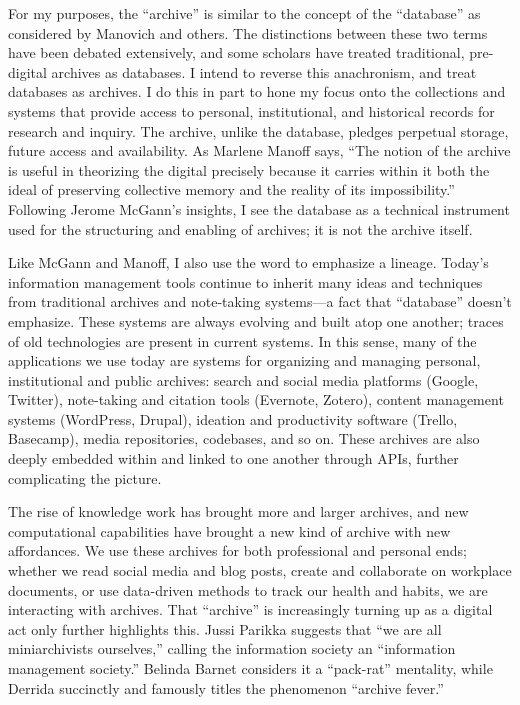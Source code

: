 For my purposes, the ``archive'' is similar to the concept of the ``database'' as considered by Manovich and others. The distinctions between these two terms have been debated extensively, and some scholars have treated traditional, pre-digital archives as databases.  I intend to reverse this anachronism, and treat databases as archives. I do this in part to hone my focus onto the collections and systems that provide access to personal, institutional, and historical records for research and inquiry. The archive, unlike the database, pledges perpetual storage, future access and availability. As Marlene Manoff says, ``The notion of the archive is useful in theorizing the digital precisely because it carries within it both the ideal of preserving collective memory and the reality of its impossibility.''  Following Jerome McGann’s insights, I see the database as a technical instrument used for the structuring and enabling of archives; it is not the archive itself. 

Like McGann and Manoff, I also use the word to emphasize a lineage. Today’s information management tools continue to inherit many ideas and techniques from traditional archives and note-taking systems—a fact that ``database'' doesn’t emphasize. These systems are always evolving and built atop one another; traces of old technologies are present in current systems. In this sense, many of the applications we use today are systems for organizing and managing personal, institutional and public archives: search and social media platforms (Google, Twitter), note-taking and citation tools (Evernote, Zotero), content management systems (WordPress, Drupal), ideation and productivity software (Trello, Basecamp), media repositories, codebases, and so on. These archives are also deeply embedded within and linked to one another through APIs, further complicating the picture.

The rise of knowledge work has brought more and larger archives, and new computational capabilities have brought a new kind of archive with new affordances. We use these archives for both professional and personal ends; whether we read social media and blog posts, create and collaborate on workplace documents, or use data-driven methods to track our health and habits, we are interacting with archives. That ``archive'' is increasingly turning up as a digital act only further highlights this. Jussi Parikka suggests that ``we are all miniarchivists ourselves,'' calling the information society an ``information management society.''  Belinda Barnet considers it a ``pack-rat'' mentality, while Derrida succinctly and famously titles the phenomenon ``archive fever.''

